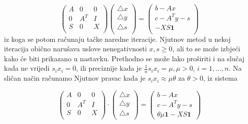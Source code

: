 \documentclass[b5paper, utf8, 11pt, colorlinks]{book}
\theoremstyle{definition}
\begin{document}
\begin{equation}
	\begin{pmatrix}
		A   & 0      &  0      \\
		0   & A^T    &  I      \\
		S   & 0      & X       \\
	\end{pmatrix}  
	\begin{pmatrix} 
		\bigtriangleup  x  \\
		\bigtriangleup  y  \\
		\bigtriangleup  s  \\
	\end{pmatrix} 
	= 
	\begin{pmatrix} 
		b - Ax             \\
		c - A^T y - s      \\
		- X S \textbf{1}  \\                   
	\end{pmatrix} 
\end{equation}
iz koga se potom računaju tačke naredne  iteracije. 
Njutnov metod   u nekoj iteracija obično narušava uslove nenegativnosti $x,s \geq 0$, ali to se može izbjeći kako će biti  prikazano u nastavku.   
Prethodno   se može lako proširiti i na slučaj kada ne vrijedi $s_ix_i = 0$, ili preciznije kada je $\frac{1}{n}s_ix_i = \mu, \mu > 0$, $i=1,\ldots,n$. Na sličan način računamo Njutnov pravac kada je $s_i x_i \approx \mu \theta$  za  $\theta >0$, iz sistema 

\begin{equation} \label{eq:newton-interior-system-k}    
	\begin{pmatrix}
		A   & 0      &  0      \\
		0   & A^T    &  I      \\
		S   & 0      & X       \\
	\end{pmatrix} 
	\cdot 
	\begin{pmatrix}
		\bigtriangleup  x  \\
		\bigtriangleup  y  \\
		\bigtriangleup  s  \\
	\end{pmatrix} 
	=
	\begin{pmatrix}
		b - Ax           \\
		c - A^T y - s      \\
		\theta \mu \mathbf{1} - X S \textbf{1}                      
	\end{pmatrix}
\end{equation}
\end{document}
